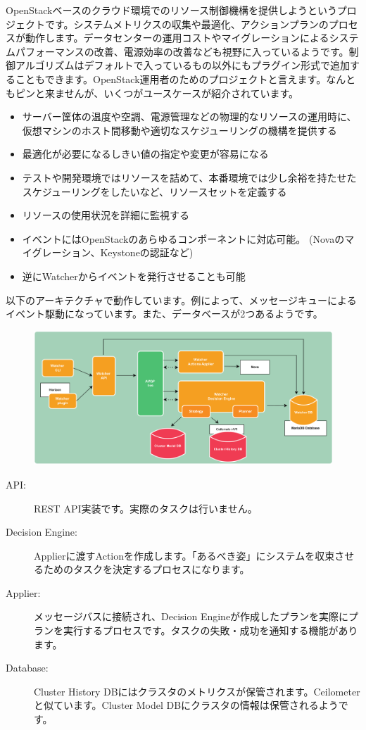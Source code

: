 OpenStackベースのクラウド環境でのリソース制御機構を提供しようというプロジェクトです。システムメトリクスの収集や最適化、アクションプランのプロセスが動作します。データセンターの運用コストやマイグレーションによるシステムパフォーマンスの改善、電源効率の改善なども視野に入っているようです。制御アルゴリズムはデフォルトで入っているもの以外にもプラグイン形式で追加することもできます。OpenStack運用者のためのプロジェクトと言えます。なんともピンと来ませんが、いくつがユースケースが紹介されています。

\begin{itemize}
	\item サーバー筐体の温度や空調、電源管理などの物理的なリソースの運用時に、仮想マシンのホスト間移動や適切なスケジューリングの機構を提供する
	\item 最適化が必要になるしきい値の指定や変更が容易になる
	\item テストや開発環境ではリソースを詰めて、本番環境では少し余裕を持たせたスケジューリングをしたいなど、リソースセットを定義する
	\item リソースの使用状況を詳細に監視する
	\item イベントにはOpenStackのあらゆるコンポーネントに対応可能。 (Novaのマイグレーション、Keystoneの認証など)
	\item 逆にWatcherからイベントを発行させることも可能
\end{itemize}

以下のアーキテクチャで動作しています。例によって、メッセージキューによるイベント駆動になっています。また、データベースが2つあるようです。

\begin{figure}
	\includegraphics[width=\textwidth]{img/watcher-architecture.pdf}
\end{figure}

\begin{description}
	\item[API:] REST API実装です。実際のタスクは行いません。
	\item[Decision Engine:] Applierに渡すActionを作成します。「あるべき姿」にシステムを収束させるためのタスクを決定するプロセスになります。
	\item[Applier:] メッセージバスに接続され、Decision Engineが作成したプランを実際にプランを実行するプロセスです。タスクの失敗・成功を通知する機能があります。
	\item[Database:] Cluster History DBにはクラスタのメトリクスが保管されます。Ceilometerと似ています。Cluster Model DBにクラスタの情報は保管されるようです。
\end{description}
